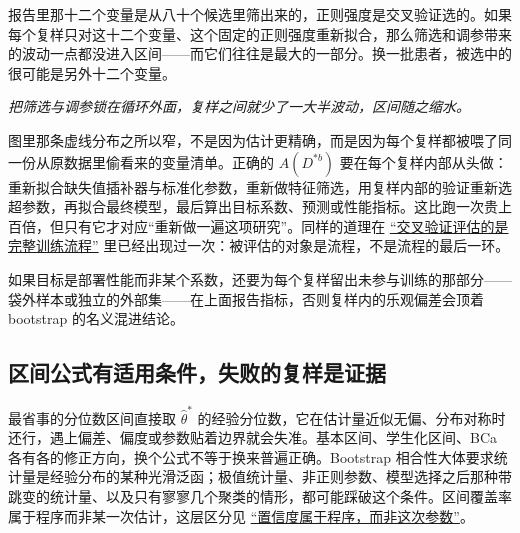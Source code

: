 报告里那十二个变量是从八十个候选里筛出来的，正则强度是交叉验证选的。如果每个复样只对这十二个变量、这个固定的正则强度重新拟合，那么筛选和调参带来的波动一点都没进入区间——而它们往往是最大的一部分。换一批患者，被选中的很可能是另外十二个变量。

\begin{center}
\end{center}

\emph{把筛选与调参锁在循环外面，复样之间就少了一大半波动，区间随之缩水。}

图里那条虚线分布之所以窄，不是因为估计更精确，而是因为每个复样都被喂了同一份从原数据里偷看来的变量清单。正确的 \(A(D^{*b})\) 要在每个复样内部从头做：重新拟合缺失值插补器与标准化参数，重新做特征筛选，用复样内部的验证重新选超参数，再拟合最终模型，最后算出目标系数、预测或性能指标。这比跑一次贵上百倍，但只有它才对应``重新做一遍这项研究''。同样的道理在 \hyperref[sec:11-Mathematical-Statistics/06-Resampling-and-Model-Selection/03]{``交叉验证评估的是完整训练流程''} 里已经出现过一次：被评估的对象是流程，不是流程的最后一环。

如果目标是部署性能而非某个系数，还要为每个复样留出未参与训练的那部分——袋外样本或独立的外部集——在上面报告指标，否则复样内的乐观偏差会顶着 bootstrap 的名义混进结论。

\subsection{区间公式有适用条件，失败的复样是证据}

最省事的分位数区间直接取 \(\widehat\theta^{*}\) 的经验分位数，它在估计量近似无偏、分布对称时还行，遇上偏差、偏度或参数贴着边界就会失准。基本区间、学生化区间、BCa 各有各的修正方向，换个公式不等于换来普遍正确。Bootstrap 相合性大体要求统计量是经验分布的某种光滑泛函；极值统计量、非正则参数、模型选择之后那种带跳变的统计量、以及只有寥寥几个聚类的情形，都可能踩破这个条件。区间覆盖率属于程序而非某一次估计，这层区分见 \hyperref[sec:11-Mathematical-Statistics/04-Interval-Estimation/01]{``置信度属于程序，而非这次参数''}。

